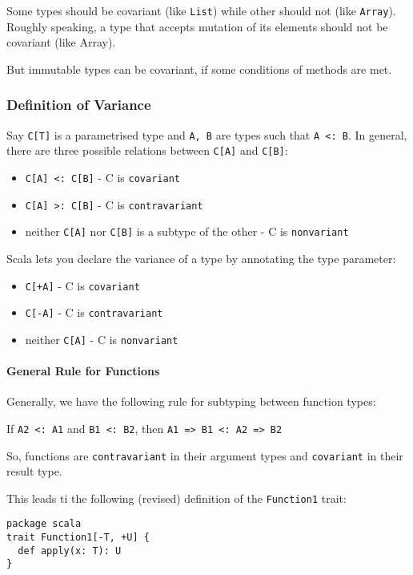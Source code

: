 \documentclass{scrartcl}
\newcommand{\term}[1]{\verb~#1~} %
\begin{document}
Some types should be covariant (like \lstinline|List|) while other should not
(like \lstinline|Array|). Roughly speaking, a type that accepts mutation of its
elements should not be covariant (like Array).

But immutable types can be covariant, if some conditions of methods are met.

\subsubsection{Definition of Variance}

Say \lstinline|C[T]| is a parametrised type and \lstinline|A, B| are types such
that \lstinline|A <: B|. In general, there are three possible relations between
\lstinline|C[A]| and \lstinline|C[B]|:
\begin{itemize}
\item \lstinline|C[A] <: C[B]| - C is \term{covariant}
\item \lstinline|C[A] >: C[B]| - C is \term{contravariant}
\item neither \lstinline|C[A]| nor \lstinline|C[B]| is a subtype of the other -
  C is \term{nonvariant}
\end{itemize}

Scala lets you declare the variance of a type by annotating the type parameter:
\begin{itemize}
\item \lstinline|C[+A]| - C is \term{covariant}
\item \lstinline|C[-A]| - C is \term{contravariant}
\item neither \lstinline|C[A]| - C is \term{nonvariant}
\end{itemize}

\paragraph{General Rule for Functions}

Generally, we have the following rule for subtyping between function types:

If \lstinline|A2 <: A1| and \lstinline|B1 <: B2|, then
\lstinline|A1 => B1 <: A2 => B2|

So, functions are \term{contravariant} in their argument types and
\term{covariant} in their result type.

This leads ti the following (revised) definition of the \lstinline|Function1|
trait:
\begin{lstlisting}
package scala
trait Function1[-T, +U] {
  def apply(x: T): U
}
\end{lstlisting}
\end{document}
